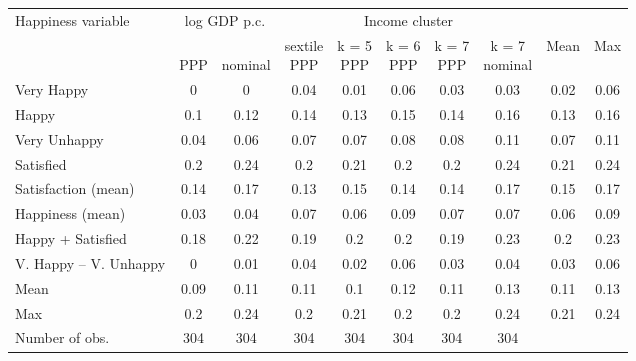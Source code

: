 
\begin{tabular}[t]{lccccccccc}
\toprule Happiness variable & \multicolumn{2}{c}{log GDP p.c.} & \multicolumn{5}{c}{Income cluster} & & \\
  & \makecell{\,\\PPP} & \makecell{\,\\nominal} & \makecell{sextile\\PPP} & \makecell{k = 5\\PPP} & \makecell{k = 6\\PPP} & \makecell{k = 7\\PPP} & \makecell{k = 7\\nominal} & Mean & Max\\
\midrule
Very Happy & 0 & 0 & 0.04 & 0.01 & 0.06 & 0.03 & 0.03 & 0.02 & 0.06\\
Happy & 0.1 & 0.12 & 0.14 & 0.13 & 0.15 & 0.14 & 0.16 & 0.13 & 0.16\\
Very Unhappy & 0.04 & 0.06 & 0.07 & 0.07 & 0.08 & 0.08 & 0.11 & 0.07 & 0.11\\
Satisfied & 0.2 & 0.24 & 0.2 & 0.21 & 0.2 & 0.2 & 0.24 & 0.21 & 0.24\\
Satisfaction (mean) & 0.14 & 0.17 & 0.13 & 0.15 & 0.14 & 0.14 & 0.17 & 0.15 & 0.17\\
Happiness (mean) & 0.03 & 0.04 & 0.07 & 0.06 & 0.09 & 0.07 & 0.07 & 0.06 & 0.09\\
Happy + Satisfied & 0.18 & 0.22 & 0.19 & 0.2 & 0.2 & 0.19 & 0.23 & 0.2 & 0.23\\
V. Happy -- V. Unhappy & 0 & 0.01 & 0.04 & 0.02 & 0.06 & 0.03 & 0.04 & 0.03 & 0.06\\ \midrule 
Mean & 0.09 & 0.11 & 0.11 & 0.1 & 0.12 & 0.11 & 0.13 & 0.11 & 0.13\\
Max & 0.2 & 0.24 & 0.2 & 0.21 & 0.2 & 0.2 & 0.24 & 0.21 & 0.24\\ \midrule 
Number of obs. & 304 & 304 & 304 & 304 & 304 & 304 & 304 &  & \\
\bottomrule
\end{tabular}